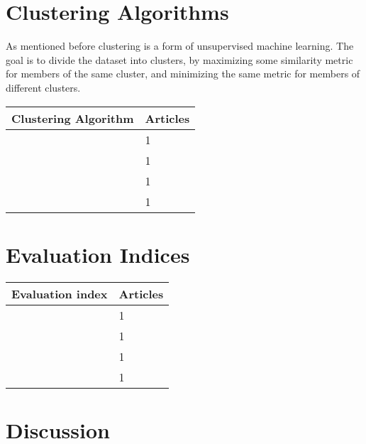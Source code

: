 \section{Clustering Algorithms}
As mentioned before clustering is a form of unsupervised machine learning. 
The goal is to divide the dataset into clusters, by maximizing some similarity metric for members of the same cluster, and minimizing the same metric for members of different clusters.

\begin{table*}[h]
    \centering
    \begin{tabular}{p{}p{}}
        \toprule
        Clustering Algorithm & Articles \\
        \midrule
          & 1 \\
          & 1 \\
          & 1 \\
          & 1 \\
        \bottomrule
    \end{tabular}
    \caption{}
    \label{tab:}
\end{table*}

\section{Evaluation Indices} 

\begin{table*}[h]
    \centering
    \begin{tabular}{p{}p{}}
        \toprule
        Evaluation index & Articles \\
        \midrule
         & 1 \\
         & 1 \\
         & 1 \\
         & 1 \\
        \bottomrule
    \end{tabular}
    \caption{}
    \label{tab:}
\end{table*}

\section{Discussion}
